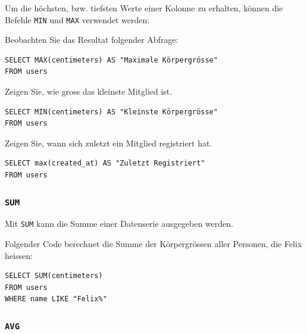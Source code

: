 Um die höchsten, bzw. tiefsten Werte einer Kolonne zu erhalten, können die Befehle \lstinline|MIN| und \lstinline|MAX| verwendet werden:

\begin{myexample}
Beobachten Sie das Resultat folgender Abfrage:

\begin{lstlisting}
SELECT MAX(centimeters) AS "Maximale Körpergrösse" 
FROM users
\end{lstlisting}
\end{myexample}

\begin{myexercise}
  Zeigen Sie, wie gross das kleinste Mitglied ist.
  \begin{myanswer}
    \begin{lstlisting}
SELECT MIN(centimeters) AS "Kleinste Körpergrösse"
FROM users
\end{lstlisting}
  \end{myanswer}
\end{myexercise}
\begin{myexercise}
  Zeigen Sie, wann sich zuletzt ein Mitglied registriert hat.
  \begin{myanswer}
    \begin{lstlisting}
SELECT max(created_at) AS "Zuletzt Registriert"
FROM users
\end{lstlisting}
  \end{myanswer}
\end{myexercise}


\subsubsection{\texorpdfstring{\lstinline|SUM|}{SUM}}

Mit \lstinline|SUM| kann die Summe einer Datenserie ausgegeben werden.

\begin{myexample}
Folgender Code berechnet die Summe der Körpergrössen aller Personen, die Felix heissen:

\begin{lstlisting}
SELECT SUM(centimeters) 
FROM users 
WHERE name LIKE "Felix%"
\end{lstlisting}
\end{myexample}

\subsubsection{\texorpdfstring{\lstinline|AVG|}{AVG}}

